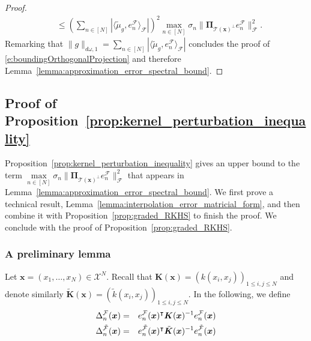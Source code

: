 \documentclass[twoside,11pt]{book}
\numberwithin{theorem}{chapter}
\numberwithin{definition}{chapter}
\numberwithin{proposition}{chapter}
\numberwithin{corollary}{chapter}
\numberwithin{example}{chapter}
\numberwithin{lemma}{chapter}
\numberwithin{assumption}{chapter}
\numberwithin{equation}{chapter}
\numberwithin{figure}{chapter}
\DeclareMathOperator{\Tran}{\intercal}
\newcommand{\pc}[1]{\textcolor{blue}{#1}}
\begin{document}
\begin{proof}
\begin{align}
    & \leq \left( \sum\limits_{n \in [N]} |\langle \tilde{\mu}_{g}, e_{n}^{\mathcal{F}} \rangle_{\mathcal{F}}| \right)^{2} \max\limits_{n \in [N]}\sigma_{n}  \|\bm{\Pi}_{\mathcal{T}(\bm{x})^{\perp}}e_{n}^{\mathcal{F}}\|_{\mathcal{F}}^{2} .
\end{align}
%
Remarking that
$ \|g \|_{d\omega,1} = \sum\limits_{n \in [N]} |\langle \tilde{\mu}_{g}, e_{n}^{\mathcal{F}} \rangle_{\mathcal{F}}|
$
concludes the proof of \eqref{e:boundingOrthogonalProjection} and therefore Lemma~\ref{lemma:approximation_error_spectral_bound}.
\end{proof}


\subsection{Proof of Proposition~\ref{prop:kernel_perturbation_inequality}}
\label{s:proofOfPerturbationInequality}
Proposition~\ref{prop:kernel_perturbation_inequality} gives an upper bound to the term $\max\limits_{n \in [N]}\sigma_{n}  \|\bm{\Pi}_{\mathcal{T}(\bm{x})^{\perp}}e_{n}^{\mathcal{F}}\|_{\mathcal{F}}^{2}$ that appears in Lemma~\ref{lemma:approximation_error_spectral_bound}.
We first prove a technical result, Lemma~\ref{lemma:interpolation_error_matricial_form}, and then combine it with  Proposition~\ref{prop:graded_RKHS} to finish the proof. We conclude with the proof of Proposition~\ref{prop:graded_RKHS}.

%

\subsubsection{A preliminary lemma}

Let $\bm{x} = (x_{1}, \dots, x_{N}) \in \mathcal{X}^{N}$. Recall that $\bm{K}(\bm{x}) = (k(x_{i},x_{j}))_{1 \leq i,j \leq N}$ and denote similarly $\tilde{\bm{K}}(\bm{x}) = (\tilde{k}(x_{i},x_{j}))_{1 \leq i,j \leq N}$.
%
In the following, we define  %
\begin{eqnarray}
  \Delta_n^{\cal F}(\bm{x}) & = & e_{n}^{\mathcal{F}}(\bm{x})^{\Tran}\bm{K}(\bm{x})^{-1}e_{n}^{\mathcal{F}}(\bm{x})\\
  \Delta_n^{\tilde{\cal F}}(\bm{x}) & = & e_{n}^{\tilde{\mathcal{F}}}(\bm{x})^{\Tran}\tilde{\bm{K}}(\bm{x})^{-1}e_{n}^{\tilde{\mathcal{F}}}(\bm{x})
\end{eqnarray}
\end{document}
